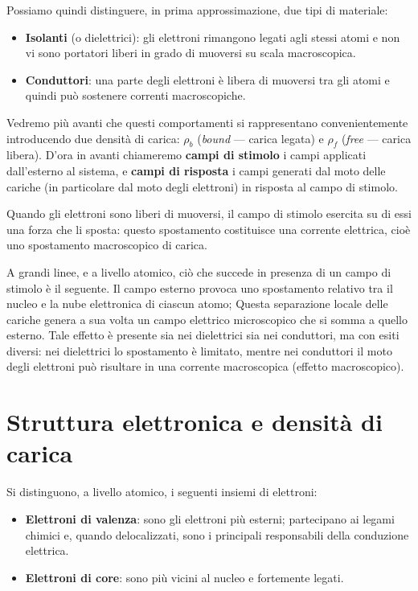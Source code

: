 \documentclass{book}
\begin{document}
Possiamo quindi distinguere, in prima approssimazione, due tipi di materiale:
\begin{itemize}
  \item \textbf{Isolanti} (o dielettrici): gli elettroni rimangono legati agli stessi atomi e non vi sono portatori liberi in grado di muoversi su scala macroscopica.
  \item \textbf{Conduttori}: una parte degli elettroni è libera di muoversi tra gli atomi e quindi può sostenere correnti macroscopiche.
\end{itemize}

Vedremo più avanti che questi comportamenti si rappresentano convenientemente introducendo due densità di carica: $\rho_b$ (\emph{bound} — carica legata) e $\rho_f$ (\emph{free} — carica libera). D'ora in avanti chiameremo \textbf{campi di stimolo} i campi applicati dall'esterno al sistema, e \textbf{campi di risposta} i campi generati dal moto delle cariche (in particolare dal moto degli elettroni) in risposta al campo di stimolo.

Quando gli elettroni sono liberi di muoversi, il campo di stimolo esercita su di essi una forza che li sposta: questo spostamento costituisce una corrente elettrica, cioè uno spostamento macroscopico di carica.

A grandi linee, e a livello atomico, ciò che succede in presenza di un campo di stimolo è il seguente. Il campo esterno provoca uno spostamento relativo tra il nucleo e la nube elettronica di ciascun atomo; Questa separazione locale delle cariche genera a sua volta un campo elettrico microscopico che si somma a quello esterno. Tale effetto è presente sia nei dielettrici sia nei conduttori, ma con esiti diversi: nei dielettrici lo spostamento è limitato, mentre nei conduttori il moto degli elettroni può risultare in una corrente macroscopica (effetto macroscopico).

\section*{Struttura elettronica e densità di carica}

Si distinguono, a livello atomico, i seguenti insiemi di elettroni:
\begin{itemize}
  \item \textbf{Elettroni di valenza}: sono gli elettroni più esterni; partecipano ai legami chimici e, quando delocalizzati, sono i principali responsabili della conduzione elettrica.
  \item \textbf{Elettroni di core}: sono più vicini al nucleo e fortemente legati.
\end{itemize}
\end{document}
